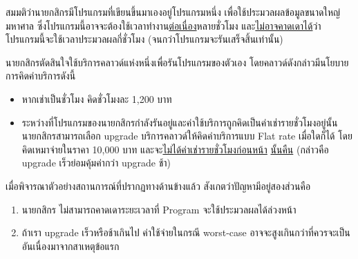 \question{}

สมมติว่านายกสิกรมีโปรแกรมที่เขียนขึ้นมาเองอยู่โปรแกรมหนึ่ง เพื่อใช้ประมวลผลข้อมูลขนาดใหญ่มหาศาล
ซึ่งโปรแกรมนี้อาจจะต้องใช้เวลาทำงาน\uline{ต่อเนื่อง}หลายชั่วโมง 
และ\uline{ไม่อาจคาดเดาได้}ว่าโปรแกรมนี้จะใช้เวลาประมวลผลกี่ชั่วโมง (จนกว่าโปรแกรมจะรันเสร็จสิ้นเท่านั้น)

นายกสิกรตัดสินใจใช้บริการคลาวด์แห่งหนึ่งเพื่อรันโปรแกรมของตัวเอง 
โดยคลาวด์ดังกล่าวมีนโยบายการคิดค่าบริการดังนี้
\begin{itemize}
\item หากเช่าเป็นชั่วโมง คิดชั่วโมงละ 1,200 บาท
\item ระหว่างที่โปรแกรมของนายกสิกรกำลังรันอยู่และค่าใช้บริการถูกคิดเป็นค่าเช่ารายชั่วโมงอยู่นั้น\;    
    นายกสิกรสามารถเลือก upgrade บริการคลาวด์ให้คิดค่าบริการแบบ Flat rate เมื่อใดก็ได้
    โดยคิดเหมาจ่ายในราคา 10,000 บาท และจะ\uline{ไม่ได้ค่าเช่ารายชั่วโมงก่อนหน้า} 
    \uline{นั้นคืน} (กล่าวคือ upgrade เร็วย่อมคุ้มค่ากว่า upgrade ช้า)
\end{itemize}

\noindent
เมื่อพิจารณาตัวอย่างสถานการณ์ที่ปรากฏทางด้านข้างแล้ว สังเกตว่าปัญหามีอยู่สองส่วนคือ
\begin{enumerate}
\item นายกสิกร ไม่สามารถคาดเดาระยะเวลาที่ Program จะใช้ประมวลผลได้ล่วงหน้า
\item ถ้าเรา upgrade เร็วหรือช้าเกินไป ค่าใช้จ่ายในกรณี worst-case
        อาจจะสูงเกินกว่าที่ควรจะเป็น อันเนื่องมาจากสาเหตุข้อแรก
\end{enumerate}

